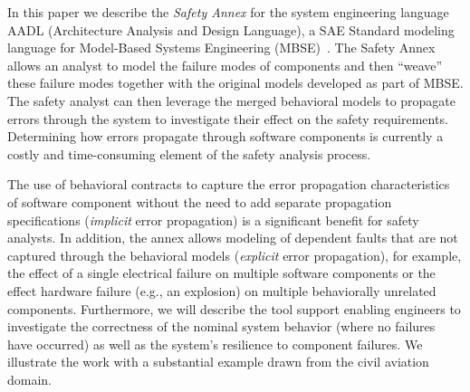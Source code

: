 In this paper we describe the \emph{Safety Annex} for the system engineering language AADL (Architecture Analysis and Design Language), a SAE Standard modeling language for Model-Based Systems Engineering (MBSE)~\cite{AADL_Standard}. The Safety Annex allows an analyst to model the failure modes of components and then ``weave'' these failure modes together with the original models developed as part of MBSE. The safety analyst can then leverage the merged behavioral models to propagate %
errors through the system to investigate their effect on the safety requirements. %
Determining how %
errors propagate through software components is currently a costly and time-consuming element of the safety analysis process. 
\begin{comment} 
The use of behavioral contracts to capture the implicit %
error propagation characteristics of software component is a significant benefit for safety analysts.  
In addition, the annex allows modeling of explicit %
error propagation that is not captured through the behavioral models, for example, the effect of a single electrical failure on multiple software components or the effect hardware failure (e.g., an explosion) on multiple behaviorally unrelated components. 
\end{comment}
The use of behavioral contracts to capture the %
error propagation characteristics of software component without the need to add separate propagation specifications (\emph{implicit} error propagation) is a significant benefit for safety analysts.  
In addition, the annex allows modeling of %
dependent faults that are not captured through the behavioral models (\emph{explicit} error propagation),
for example, the effect of a single electrical failure on multiple software components or the effect hardware failure (e.g., an explosion) on multiple behaviorally unrelated components. 
Furthermore, we will describe the tool support enabling engineers to investigate the correctness of the nominal system behavior (where no failures have occurred) as well as the system's resilience to component failures. We illustrate the work with a substantial example drawn from the civil aviation domain.

